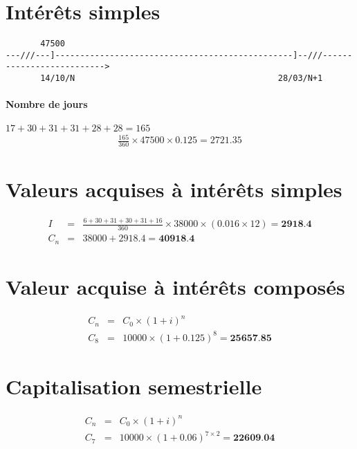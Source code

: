 \documentclass{article}
\begin{document}
	\maketitle
	\section{Intérêts simples}
	\begin{verbatim}
       47500
---///---]------------------------------------------------]--///-------------------------->	
	   14/10/N                                         28/03/N+1
	\end{verbatim}
	\paragraph{Nombre de jours} $17+30+31+31+28+28 = 165$	
	\begin{eqnarray*}
		\frac{165}{360} \times 47500 \times 0.125 = 2721.35
	\end{eqnarray*}
	\section{Valeurs acquises à intérêts simples}
	\begin{eqnarray*}
		I &=& \frac{6 + 30 + 31 + 30 + 31 + 16}{360} \times 38000 \times (0.016 \times 12) = \textbf{2918.4}\\
		C_n &=& 38000+2918.4 = \textbf{40918.4}
	\end{eqnarray*}
	\section{Valeur acquise à intérêts composés}
	\begin{eqnarray*}
		C_n &=& C_0 \times (1+i)^n\\
		C_8 &=& 10000 \times (1 + 0.125)^{8} = \textbf{25657.85}
	\end{eqnarray*}
	\section{Capitalisation semestrielle}
		\begin{eqnarray*}
			C_n &=& C_0 \times (1+i)^n\\
			C_7 &=& 10000 \times (1 + 0.06)^{7\times2} = \textbf{22609.04}
		\end{eqnarray*}
\end{document}
